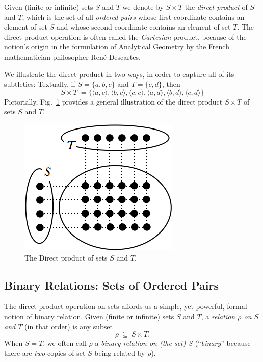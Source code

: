 Given (finite or infinite) sets $S$ and $T$ we denote by $S \times T$
 the {\it direct product} of $S$ and $T$,
 which is the set of all {\it ordered
  pairs}  whose first coordinate
contains an element of set $S$ and whose second coordinate contains an
element of set $T$.  The direct product operation is often called the
{\it Cartesian} product,  because of
the notion's origin in the formulation of Analytical Geometry by the
French mathematician-philosopher Ren\'{e} Descartes. 

We illustrate the direct product in two ways, in order to capture all
of its subtleties: Textually, if $S = \{a,b,c\}$ and $T = \{c,d\}$,
then
\[ S \times T \ =  \{
\langle a,c \rangle,
\langle b,c \rangle,
\langle c,c \rangle,
\langle a,d \rangle,
\langle b,d \rangle,
\langle c,d \rangle\}
\]
Pictorially,
Fig.~\ref{fig:cartesianproduct} provides a general illustration of
the direct product $S \times T$ of sets $S$ and $T$.
\begin{figure}[htb]
\begin{center}
        \includegraphics[scale=0.4]{FiguresMaths/cartesianProduct}
        \caption{The Direct product of sets $S$ and $T$.}
        \label{fig:cartesianproduct}
\end{center}
\end{figure}

\subsection{Binary Relations: Sets of Ordered Pairs}
\label{sec:relation}

The direct-product operation on sets affords us a simple, yet
powerful, formal notion of binary relation.  Given (finite or
infinite) sets $S$ and $T$, a {\it relation $\rho$ on $S$ and
  $T$} (in that order) is any subset
\[ \rho \ \subseteq \ S \times T. \]
When $S = T$, we often call $\rho$ a {\em binary relation on (the set)
  $S$} (``{\em binary}'' because there
are {\em two} copies of set $S$ being related by $\rho$).

